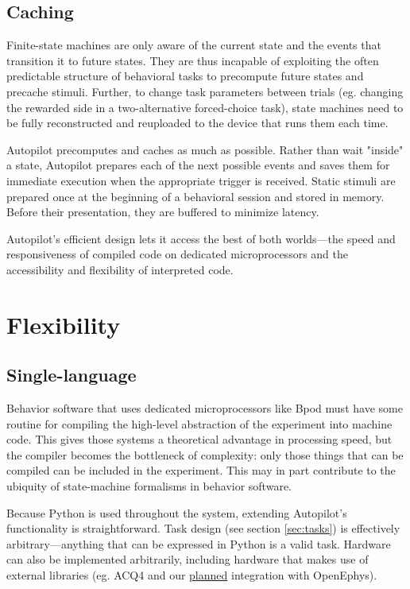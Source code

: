 \subsection{Caching}

Finite-state machines are only aware of the current state and the events that transition it to future states. They are thus incapable of exploiting the often predictable structure of behavioral tasks to precompute future states and precache stimuli. Further, to change task parameters between trials (eg. changing the rewarded side in a two-alternative forced-choice task), state machines need to be fully reconstructed and reuploaded to the device that runs them each time.

Autopilot precomputes and caches as much as possible. Rather than wait "inside" a state, Autopilot prepares each of the next possible events and saves them for immediate execution when the appropriate trigger is received. Static stimuli are prepared once at the beginning of a behavioral session and stored in memory. Before their presentation, they are buffered to minimize latency.

\vspace{16pt}

Autopilot's efficient design lets it access the best of both worlds---the speed and responsiveness of compiled code on dedicated microprocessors and the accessibility and flexibility of interpreted code.

\clearpage

\section{Flexibility}
\label{sec:flexibility}

\subsection{Single-language}
\label{sec:singlelanguage}

Behavior software that uses dedicated microprocessors like Bpod must have some routine for compiling the high-level abstraction of the experiment into machine code. This gives those systems a theoretical advantage in processing speed, but the compiler becomes the bottleneck of complexity: only those things that can be compiled can be included in the experiment. This may in part contribute to the ubiquity of state-machine formalisms in behavior software.

Because Python is used throughout the system, extending Autopilot's functionality is straightforward. Task design (see section \hyperref[sec:tasks]{\ref*{sec:tasks}}) is effectively arbitrary---anything that can be expressed in Python is a valid task. Hardware can also be implemented arbitrarily, including hardware that makes use of external libraries (eg. ACQ4\citep{campagnolaACQ4OpensourceSoftware2014} and our \hyperref[item:othertools]{planned} integration with OpenEphys).


